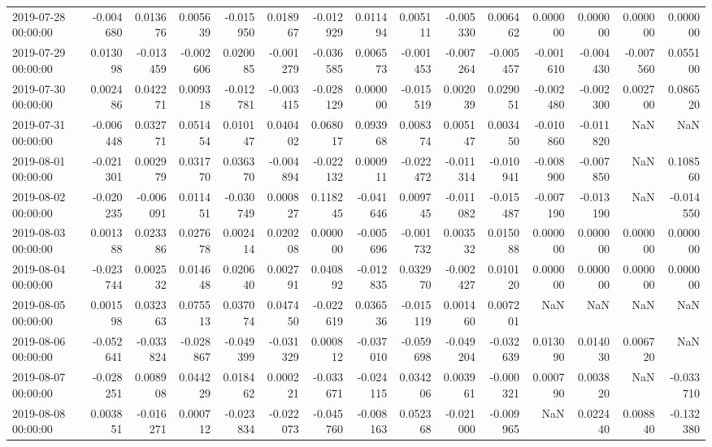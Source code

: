 \begin{tabular}{lrrrrrrrrrrrrrr}
2019-07-28 00:00:00 & -0.004680 & 0.013676 & 0.005639 & -0.015950 & 0.018967 & -0.012929 & 0.011494 & 0.005111 & -0.005330 & 0.006462 & 0.000000 & 0.000000 & 0.000000 & 0.000000 \\
2019-07-29 00:00:00 & 0.013098 & -0.013459 & -0.002606 & 0.020085 & -0.001279 & -0.036585 & 0.006573 & -0.001453 & -0.007264 & -0.005457 & -0.001610 & -0.004430 & -0.007560 & 0.055100 \\
2019-07-30 00:00:00 & 0.002486 & 0.042271 & 0.009318 & -0.012781 & -0.003415 & -0.028129 & 0.000000 & -0.015519 & 0.002039 & 0.029051 & -0.002480 & -0.002300 & 0.002700 & 0.086520 \\
2019-07-31 00:00:00 & -0.006448 & 0.032771 & 0.051454 & 0.010147 & 0.040402 & 0.068017 & 0.093968 & 0.008374 & 0.005147 & 0.003450 & -0.010860 & -0.011820 & NaN & NaN \\
2019-08-01 00:00:00 & -0.021301 & 0.002979 & 0.031770 & 0.036370 & -0.004894 & -0.022132 & 0.000911 & -0.022472 & -0.011314 & -0.010941 & -0.008900 & -0.007850 & NaN & 0.108560 \\
2019-08-02 00:00:00 & -0.020235 & -0.006091 & 0.011451 & -0.030749 & 0.000827 & 0.118245 & -0.041646 & 0.009745 & -0.011082 & -0.015487 & -0.007190 & -0.013190 & NaN & -0.014550 \\
2019-08-03 00:00:00 & 0.001388 & 0.023386 & 0.027678 & 0.002414 & 0.020208 & 0.000000 & -0.005696 & -0.001732 & 0.003532 & 0.015088 & 0.000000 & 0.000000 & 0.000000 & 0.000000 \\
2019-08-04 00:00:00 & -0.023744 & 0.002532 & 0.014648 & 0.020640 & 0.002791 & 0.040892 & -0.012835 & 0.032970 & -0.002427 & 0.010120 & 0.000000 & 0.000000 & 0.000000 & 0.000000 \\
2019-08-05 00:00:00 & 0.001598 & 0.032363 & 0.075513 & 0.037074 & 0.047450 & -0.022619 & 0.036536 & -0.015119 & 0.001460 & 0.007201 & NaN & NaN & NaN & NaN \\
2019-08-06 00:00:00 & -0.052641 & -0.033824 & -0.028867 & -0.049399 & -0.031329 & 0.000812 & -0.037010 & -0.059698 & -0.049204 & -0.032639 & 0.013090 & 0.014030 & 0.006720 & NaN \\
2019-08-07 00:00:00 & -0.028251 & 0.008908 & 0.044229 & 0.018462 & 0.000221 & -0.033671 & -0.024115 & 0.034206 & 0.003961 & -0.000321 & 0.000790 & 0.003820 & NaN & -0.033710 \\
2019-08-08 00:00:00 & 0.003851 & -0.016271 & 0.000712 & -0.023834 & -0.022073 & -0.045760 & -0.008163 & 0.052368 & -0.021000 & -0.009965 & NaN & 0.022440 & 0.008840 & -0.132380 \\

\end{tabular}
